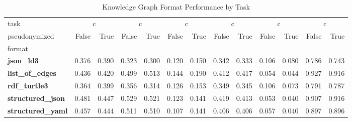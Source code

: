 \begin{table}
\caption{Knowledge Graph Format Performance by Task}
\label{tab:results}
\begin{tabular}{lrrrrrrrrrrrr}
\toprule
task & \multicolumn{2}{c}{c}{AggByRelation} & \multicolumn{2}{c}{c}{AggNeighborProperties} & \multicolumn{2}{c}{c}{HighestDegreeNode} & \multicolumn{2}{c}{c}{Overall} & \multicolumn{2}{c}{c}{ShortestPath} & \multicolumn{2}{c}{c}{TripleRetrieval} \\
pseudonymized & False & True & False & True & False & True & False & True & False & True & False & True \\
format &  &  &  &  &  &  &  &  &  &  &  &  \\
\midrule
\textbf{json_ld3} & 0.376 & 0.390 & 0.323 & 0.300 & 0.120 & 0.150 & 0.342 & 0.333 & 0.106 & 0.080 & 0.786 & 0.743 \\
\textbf{list_of_edges} & 0.436 & 0.420 & 0.499 & 0.513 & 0.144 & 0.190 & 0.412 & 0.417 & 0.054 & 0.044 & 0.927 & 0.916 \\
\textbf{rdf_turtle3} & 0.364 & 0.399 & 0.356 & 0.314 & 0.126 & 0.153 & 0.349 & 0.345 & 0.106 & 0.073 & 0.791 & 0.787 \\
\textbf{structured_json} & 0.481 & 0.447 & 0.529 & 0.521 & 0.123 & 0.141 & 0.419 & 0.413 & 0.053 & 0.040 & 0.907 & 0.916 \\
\textbf{structured_yaml} & 0.457 & 0.444 & 0.511 & 0.510 & 0.107 & 0.141 & 0.406 & 0.406 & 0.057 & 0.040 & 0.897 & 0.896 \\
\bottomrule
\end{tabular}
\end{table}
